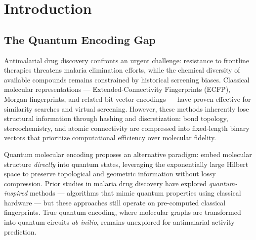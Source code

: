 %

\section{Introduction}

\subsection{The Quantum Encoding Gap}

Antimalarial drug discovery confronts an urgent challenge: resistance to frontline therapies threatens malaria elimination efforts,\cite{WHO2023Malaria} while the chemical diversity of available compounds remains constrained by historical screening biases.\cite{Burrows2017ChemicalSpace} Classical molecular representations — Extended-Connectivity Fingerprints (ECFP),\cite{Rogers2010ECFP} Morgan fingerprints,\cite{RDKit2023} and related bit-vector encodings — have proven effective for similarity searches and virtual screening.\cite{Cereto-Massague2015Fingerprints} However, these methods inherently lose structural information through hashing and discretization: bond topology, stereochemistry, and atomic connectivity are compressed into fixed-length binary vectors that prioritize computational efficiency over molecular fidelity.

Quantum molecular encoding\cite{Boy2025QMSE,Rupp2012CoulombMatrix} proposes an alternative paradigm: embed molecular structure \textit{directly} into quantum states, leveraging the exponentially large Hilbert space to preserve topological and geometric information without lossy compression. Prior studies in malaria drug discovery have explored \textit{quantum-inspired} methods — algorithms that mimic quantum properties using classical hardware\cite{Sao2026P3QuantumInspired} — but these approaches still operate on pre-computed classical fingerprints. True quantum encoding, where molecular graphs are transformed into quantum circuits \textit{ab initio}, remains unexplored for antimalarial activity prediction.

